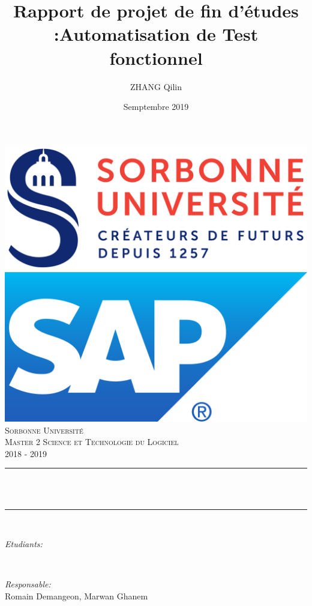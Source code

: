 \documentclass[12pt]{article}
\title{\textbf{Rapport de projet de fin d'études :\newline \newline Automatisation de Test fonctionnel}}    %
\author{ZHANG Qilin}		%
\date{Semptembre 2019}											%
\makeatletter
\let\thetitle\@title
\let\theauthor\@author
\let\thedate\@date
\makeatother
\begin{document}

\begin{titlepage}
	\centering
    \vspace*{0.5 cm}
    \includegraphics[scale = 0.15]{Logo_officiel_Sorbonne_University}\\[0.8 cm]	%
    \includegraphics[scale = 0.15]{SAP_R_grad.jpg}
    \textsc{\LARGE Sorbonne Université}\\[2.0 cm]	%
	\textsc{\Large Master 2 Science et Technologie du Logiciel\\2018 - 2019}\\[0.5 cm]		%
	\rule{\linewidth}{0.2 mm} \\[0.4 cm]
	{ \huge \bfseries \thetitle}\\
	\rule{\linewidth}{0.2 mm} \\[0.4 cm]

	\begin{minipage}{0.4\textwidth}
		\begin{flushleft} \large
			\emph{Etudiants:}\\
			\theauthor
			\end{flushleft}
			\end{minipage}~
			\begin{minipage}{0.4\textwidth}
			\begin{flushright} \large
			\emph{Responsable:} \\
			Romain Demangeon, Marwan Ghanem %
		\end{flushright}
	\end{minipage}\\[0.5 cm]
	
	{\large \thedate}\\[2 cm]
 
	\vfill
	
\end{titlepage}
\end{document}
